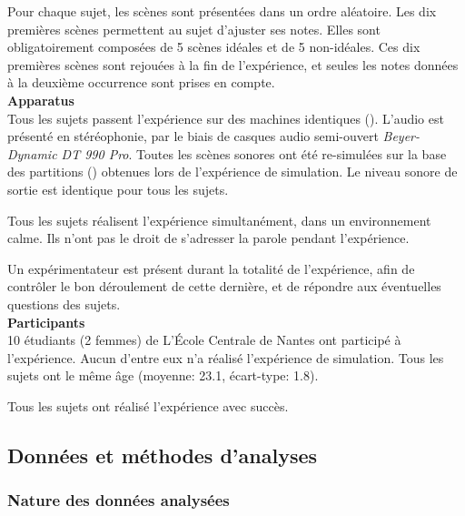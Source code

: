 Pour chaque sujet, les scènes sont présentées dans un ordre aléatoire. Les dix   premières scènes permettent au sujet d'ajuster ses notes. Elles sont obligatoirement composées de 5 scènes idéales et de 5 non-idéales. Ces dix  premières scènes sont rejouées à la fin de l'expérience, et seules les notes données à la deuxième occurrence sont prises en compte. \\

\textbf{Apparatus} \\

Tous les sujets passent l'expérience sur des machines identiques (). L'audio est présenté en stéréophonie, par le biais de casques audio semi-ouvert \emph{Beyer-Dynamic DT 990 Pro}. Toutes les scènes sonores ont été re-simulées sur la base des partitions () obtenues lors de l'expérience de simulation. Le niveau sonore de sortie est identique pour tous les sujets.

Tous les sujets réalisent l'expérience simultanément, dans un environnement calme. Ils n'ont pas le droit de s'adresser la parole pendant l'expérience. 


Un expérimentateur est présent durant la totalité de l'expérience, afin de contrôler le bon déroulement de cette dernière, et de répondre aux éventuelles questions des sujets.  \\

\textbf{Participants} \\

10 étudiants (2 femmes) de L’École Centrale de Nantes ont participé à l'expérience. Aucun d'entre eux n'a réalisé l'expérience de simulation. Tous les sujets ont   le même âge (moyenne: 23.1, écart-type: 1.8).  

Tous les sujets ont réalisé l'expérience avec succès.

\subsection{Données et méthodes d'analyses}

\subsubsection{Nature des données analysées}

